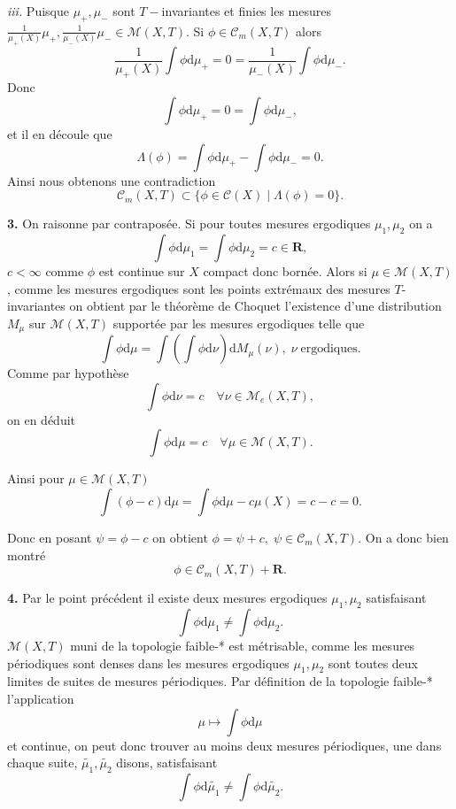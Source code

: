 \documentclass[12pt]{article}
\newcommand{\R}{\mathbf{R}}
\newcommand{\de}{\mathrm{d}}
\begin{document}
\medskip

\textit{iii.} Puisque $\mu_{+}, \mu_{-}$ sont $T-$invariantes et finies les mesures $\frac{1}{\mu_{+}(X)}\mu_{+}, \frac{1}{\mu_{-}(X)}\mu_{-} \in \mathcal{M}(X,T)$. Si $\phi \in \mathcal{C}_{m}(X,T)$ alors \[
        \frac{1}{\mu_{+}(X)}\int\phi\de\mu_{+} = 0 = \frac{1}{\mu_{-}(X)}\int\phi\de\mu_{-}
.\] Donc \[
\int\phi\de\mu_{+} = 0 = \int\phi\de\mu_{-}
,\] et il en découle que \[
\Lambda(\phi) = \int\phi\de\mu_{+} - \int\phi\de\mu_{-} = 0
.\]  
Ainsi nous obtenons une contradiction \[
        \mathcal{C}_{m}(X,T) \subset \{\phi \in \mathcal{C}(X) \;|\; \Lambda(\phi) = 0\} 
.\] 

\bigskip

\textbf{3.} On raisonne par contraposée. Si pour toutes mesures ergodiques $\mu_1, \mu_2$ on a \[
        \int\phi\de\mu_1 = \int\phi\de\mu_2 = c \in \R
,\] $c < \infty$ comme $\phi$ est continue sur $X$ compact donc bornée. Alors si $\mu \in \mathcal{M}(X,T)$, comme les mesures ergodiques sont les points extrémaux des mesures  $T$-invariantes on obtient par le théorème de Choquet l'existence d'une distribution $M_{\mu}$ sur $\mathcal{M}(X,T)$ supportée par les mesures ergodiques telle que \[
\int\phi\de\mu = \int(\int\phi\de\nu)\de M_{\mu}(\nu), \; \nu \; \text{ergodiques}
.\]  
Comme par hypothèse  \[
        \int\phi\de\nu = c \quad \forall \nu \in \mathcal{M}_{e}(X,T)
,\] on en déduit \[
\int\phi\de\mu = c \quad \forall \mu \in \mathcal{M}(X,T)
.\] 

Ainsi pour $\mu \in \mathcal{M}(X,T)$ \[
        \int(\phi - c)\de\mu = \int\phi\de\mu - c\mu(X) = c - c = 0
.\] 

Donc en posant $\psi = \phi - c$ on obtient $\phi = \psi + c, \; \psi \in \mathcal{C}_{m}(X,T)$. On a donc bien montré \[
        \phi \in \mathcal{C}_{m}(X,T) + \R
.\]  

\bigskip

\textbf{4.} Par le point précédent il existe deux mesures ergodiques $\mu_1, \mu_2$ satisfaisant \[
\int\phi\de\mu_1 \neq \int\phi\de\mu_2
.\] $\mathcal{M}(X,T)$ muni de la topologie faible-* est métrisable, comme les mesures périodiques sont denses dans les mesures ergodiques $\mu_1, \mu_2$ sont toutes deux limites de suites de mesures périodiques. Par définition de la topologie faible-* l'application \[
\mu \longmapsto \int\phi\de\mu
\] et continue, on peut donc trouver au moins deux mesures périodiques, une dans chaque suite, $\tilde{\mu_1}, \tilde{\mu_2}$ disons, satisfaisant \[
\int\phi\de\tilde{\mu_1} \neq \int\phi\de\tilde{\mu_2}
.\]  
\end{document}
